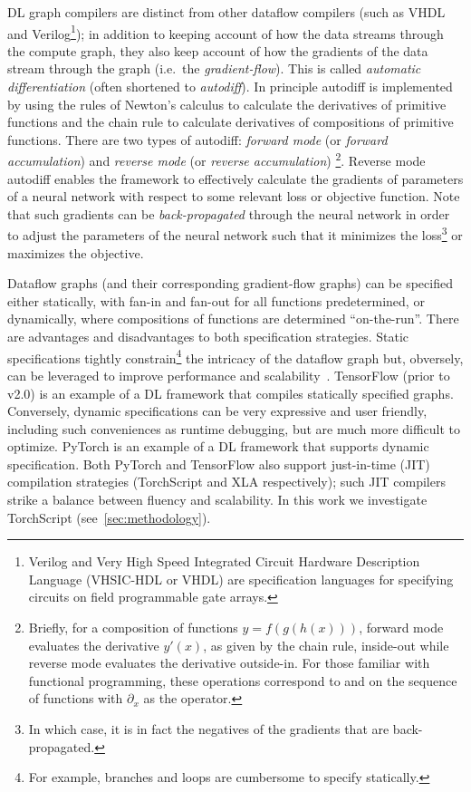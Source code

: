 DL graph compilers are distinct from other dataflow compilers (such as VHDL and Verilog\footnote{Verilog and Very High Speed Integrated Circuit Hardware Description Language (VHSIC-HDL or VHDL) are specification languages for specifying circuits on field programmable gate arrays.}); in addition to keeping account of how the data streams through the compute graph, they also keep account of how the gradients of the data stream through the graph (i.e.\ the \textit{gradient-flow}).
This is called \textit{automatic differentiation} (often shortened to \textit{autodiff}).
In principle autodiff is implemented by using the rules of Newton's calculus to calculate the derivatives of primitive functions and the chain rule to calculate derivatives of compositions of primitive functions.
There are two types of autodiff: \textit{forward mode} (or \textit{forward accumulation}) and \textit{reverse mode} (or \textit{reverse accumulation})%
\footnote{Briefly, for a composition of functions $y=f(g(h(x)))$, forward mode evaluates the derivative $y'(x)$, as given by the chain rule, inside-out while reverse mode evaluates the derivative outside-in. For those familiar with functional programming, these operations correspond to  and  on the sequence of functions with $\partial_x$ as the operator.}.
Reverse mode autodiff enables the framework to effectively calculate the gradients of parameters of a neural network with respect to some relevant loss or objective function.
Note that such gradients can be \textit{back-propagated} through the neural network in order to adjust the parameters of the neural network such that it minimizes the loss\footnote{In which case, it is in fact the negatives of the gradients that are back-propagated.} or maximizes the objective.

Dataflow graphs (and their corresponding gradient-flow graphs) can be specified either statically, with fan-in and fan-out for all functions predetermined, or dynamically, where compositions of functions are determined ``on-the-run''.
There are advantages and disadvantages to both specification strategies.
Static specifications tightly constrain\footnote{For example, branches and loops are cumbersome to specify statically.} the intricacy of the dataflow graph but, obversely, can be leveraged to improve performance and scalability~\cite{le2019tflms,Pradelle2017PolyhedralOO}.
TensorFlow (prior to v2.0) is an example of a DL framework that compiles statically specified graphs.
Conversely, dynamic specifications can be very expressive and user friendly, including such conveniences as runtime debugging, but are much more difficult to optimize.
PyTorch is an example of a DL framework that supports dynamic specification.
Both PyTorch and TensorFlow also support just-in-time (JIT) compilation strategies (TorchScript and XLA respectively);
such JIT compilers strike a balance between fluency and scalability.
In this work we investigate TorchScript (see~\cref{sec:methodology}).

